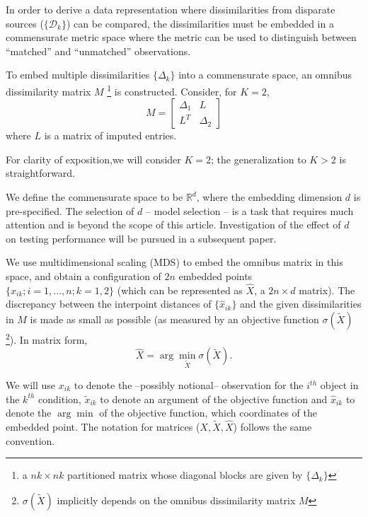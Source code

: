 \documentclass[12pt,oneside,final]{thesis}\usepackage[]{graphicx}\usepackage[]{color}
\begin{document}
  In order to derive a data representation where dissimilarities from disparate sources ($\{\mathcal{D}_k\}$)  can be compared, the dissimilarities must be embedded in a commensurate metric space where the metric can be used to distinguish between ``matched'' and ``unmatched'' observations.


To embed multiple dissimilarities  $\{\Delta_k\}$  into a commensurate space, an omnibus dissimilarity matrix  $M$ \footnote{a $nk \times nk$ partitioned matrix whose diagonal blocks are given by $\{\Delta_k\}$ }  is constructed. Consider, for $K=2$,
 \begin{equation}
M=  \left[ \begin{array}{cc}
         \Delta_1 & L\\
        L^T  & \Delta_2 
     \end{array}  \right]     \label{omnibus} 
\end{equation} where $L$ is a matrix of imputed entries.   

\begin{remark}
For clarity of exposition,we will consider $K=2$; the generalization to $K>2$ is straightforward. 
\end{remark}

We define the commensurate space to be  $\mathbb{R}^d$, where the embedding dimension $d$ is pre-specified. The selection of $d$ -- model selection -- is  a task that requires much attention and is  beyond the scope of this article. Investigation of the effect of $d$ on testing performance will be pursued in a  subsequent paper.

 We use multidimensional scaling (MDS) \cite{borg+groenen:1997} to embed  the omnibus matrix in this  space, and obtain  a configuration of $2n$ embedded points $\{\hat{x}_{ik}; i=1,\ldots,n;k=1,2\}$ (which can be represented as $\hat{X}$, a $2n \times d$ matrix). The discrepancy between the interpoint distances of $\{\hat{x}_{ik}\}$ and the given dissimilarities in  $M$ is made as small  as possible (as measured by an objective function $\sigma(\widetilde{X})$ \footnote{$\sigma(\widetilde{X})$ implicitly depends on the omnibus dissimilarity matrix $M$}). In matrix form, $$ \hat{X}=\arg \min_{\tilde{X}} \sigma(\tilde{X}).$$ 

\begin{remark} 
We will use $x_{ik}$ to denote the --possibly notional--  observation  for the $i^{th}$ object in the $k^{th}$ condition, $\tilde{x}_{ik}$ to denote an argument of the objective function  and  $\hat{x}_{ik}$  to denote the $\arg\min$  of the objective function, which coordinates of the embedded point. The notation for matrices ($X,\tilde{X},\hat{X}$) follows the  same convention.
\end{remark}
\end{document}
